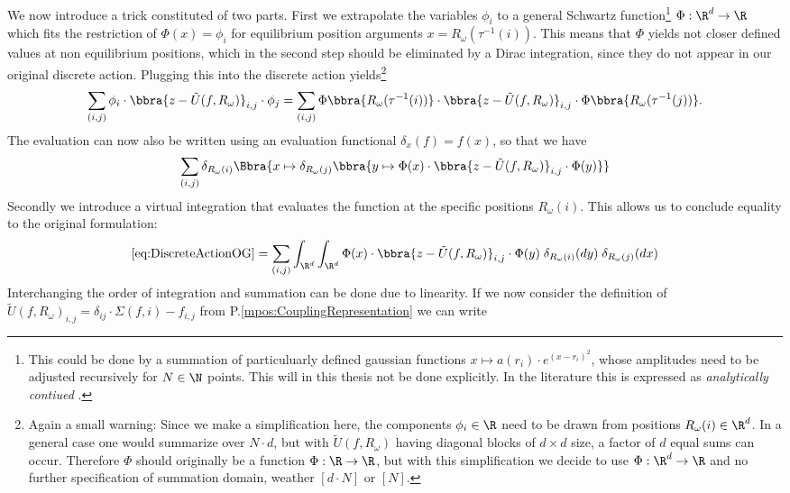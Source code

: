 We now introduce a trick constituted of two parts. First we extrapolate the variables $\phi_i$ to a general Schwartz function\footnote{This could be done by a summation of particuluarly defined gaussian functions $x\mapsto a(r_i)\cdot e^{(x - r_i)^2}$, whose amplitudes need to be adjusted recursively for $N\in\N$ points. This will in this thesis not be done explicitly. In the literature this is expressed as \emph{analytically contiued} \cite{paper:Grigera_2011,mth:vogel}.} $\Phi:\R^d\to\R$ which fits the restriction of $\Phi(x) = \phi_i$ for equilibrium position arguments $x = R_\omega(\tau^{-1}(i))$. This means that $\Phi$ yields not closer defined values at non equilibrium positions, which in the second step should be eliminated by a Dirac integration, since they do not appear in our original discrete action. Plugging this into the discrete action yields\footnote{Again a small warning: Since we make a simplification here, the components $\phi_i\in\R$ need to be drawn from positions $R_\omega(i)\in\R^d$. In a general case one would summarize over $N\cdot d$, but with $\tilde U(f,R_\omega)$ having diagonal blocks of $d\times d$ size, a factor of $d$ equal sums can occur. Therefore $\Phi$ should originally be a function $\Phi:\R\to\R$, but with this simplification we decide to use $\Phi:\R^d\to\R$ and no further specification of summation domain, weather $[d\cdot N]$ or $[N]$.}
\[
    \sum_{(i,j)}\phi_i\cdot\bbra{z - \tilde U(f,R_\omega)}_{i,j}\cdot\phi_j = \sum_{(i,j)}\Phi\bbra{
        R_\omega(\tau^{-1}(i))
    }\cdot \bbra{z - \tilde U(f,R_\omega)}_{i,j}\cdot\Phi\bbra{
        R_\omega(\tau^{-1}(j))
    }.
\]
The evaluation can now also be written using an evaluation functional $\delta_x(f) = f(x)$, so that we have
\[
    \sum_{(i,j)}\delta_{R_{\omega}(i)}\Bbra{
        x\mapsto \delta_{R_\omega(j)}\bbra{
            y\mapsto \Phi(x)\cdot\bbra{z - \tilde U(f,R_\omega)}_{i,j}\cdot\Phi(y)
        }
    }
\]
Secondly we introduce a virtual integration that evaluates the function at the specific positions $R_\omega(i)$. This allows us to conclude equality to the original formulation:
\[
    \eqref{eq:DiscreteActionOG} = \sum_{(i,j)}\int_{\R^d}\int_{\R^d}
        \Phi(x)\cdot\bbra{z - \tilde U(f,R_\omega)}_{i,j}\cdot\Phi(y)
    \;\delta_{R_\omega(i)}(dy)\;\delta_{R_\omega(j)}(dx)
\]
Interchanging the order of integration and summation can be done due to linearity. If we now consider the definition of $\tilde U(f,R_\omega)_{i,j} = \delta_{ij}\cdot\Sigma(f,i) - f_{i,j}$ from P.\ref{mpos:CouplingRepresentation} we can write 
